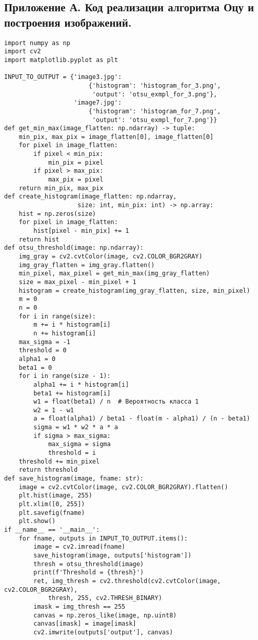 
\subsection*{Приложение А. Код реализации алгоритма Оцу и построения изображений.}

\begin{verbatim}
import numpy as np
import cv2
import matplotlib.pyplot as plt

INPUT_TO_OUTPUT = {'image3.jpg':
                       {'histogram': 'histogram_for_3.png',
                        'output': 'otsu_exmpl_for_3.png'},
                   'image7.jpg':
                       {'histogram': 'histogram_for_7.png',
                        'output': 'otsu_exmpl_for_7.png'}}
def get_min_max(image_flatten: np.ndarray) -> tuple:
    min_pix, max_pix = image_flatten[0], image_flatten[0]
    for pixel in image_flatten:
        if pixel < min_pix:
            min_pix = pixel
        if pixel > max_pix:
            max_pix = pixel
    return min_pix, max_pix
def create_histogram(image_flatten: np.ndarray, 
					size: int, min_pix: int) -> np.array:
    hist = np.zeros(size)
    for pixel in image_flatten:
        hist[pixel - min_pix] += 1
    return hist
def otsu_threshold(image: np.ndarray):
    img_gray = cv2.cvtColor(image, cv2.COLOR_BGR2GRAY)
    img_gray_flatten = img_gray.flatten()
    min_pixel, max_pixel = get_min_max(img_gray_flatten)
    size = max_pixel - min_pixel + 1
    histogram = create_histogram(img_gray_flatten, size, min_pixel)
    m = 0
    n = 0
    for i in range(size):
        m += i * histogram[i]
        n += histogram[i]
    max_sigma = -1
    threshold = 0
    alpha1 = 0
    beta1 = 0
    for i in range(size - 1):
        alpha1 += i * histogram[i]
        beta1 += histogram[i]
        w1 = float(beta1) / n  # Вероятность класса 1
        w2 = 1 - w1
        a = float(alpha1) / beta1 - float(m - alpha1) / (n - beta1) 
        sigma = w1 * w2 * a * a
        if sigma > max_sigma:
            max_sigma = sigma
            threshold = i
    threshold += min_pixel
    return threshold
def save_histogram(image, fname: str):
    image = cv2.cvtColor(image, cv2.COLOR_BGR2GRAY).flatten()
    plt.hist(image, 255)
    plt.xlim([0, 255])
    plt.savefig(fname)
    plt.show()
if __name__ == '__main__':
    for fname, outputs in INPUT_TO_OUTPUT.items():
        image = cv2.imread(fname)
        save_histogram(image, outputs['histogram'])
        thresh = otsu_threshold(image)
        print(f'Threshold = {thresh}')
        ret, img_thresh = cv2.threshold(cv2.cvtColor(image, cv2.COLOR_BGR2GRAY), 
        	thresh, 255, cv2.THRESH_BINARY)
        imask = img_thresh == 255
        canvas = np.zeros_like(image, np.uint8)
        canvas[imask] = image[imask]
        cv2.imwrite(outputs['output'], canvas)
\end{verbatim}

